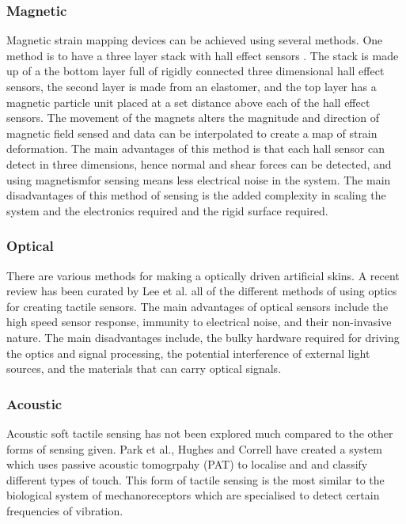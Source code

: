 \subsubsection{Magnetic}
Magnetic strain mapping devices can be achieved using several methods. One method is to have a three layer stack with hall effect sensors \cite{Yan2021}. The stack is made up of a the bottom layer full of rigidly connected three dimensional hall effect sensors, the second layer is made from an elastomer, and the top layer has a magnetic particle unit placed at a set distance above each of the hall effect sensors. The movement of the magnets alters the magnitude and direction of magnetic field sensed and data can be interpolated to create a map of strain deformation. The main advantages of this method is that each hall sensor can detect in three dimensions, hence normal and shear forces can be detected, and using magnetismfor sensing means less electrical noise in the system. The main disadvantages of this method of sensing is the added complexity in scaling the system and the electronics required and the rigid surface required.  

\subsubsection{Optical}
There are various methods for making a optically driven artificial skins. A recent review has been curated by Lee et al. \cite{Lee2023} all of the different methods of using optics for creating tactile sensors. The main advantages of optical sensors include the high speed sensor response, immunity to electrical noise, and their non-invasive nature. The main disadvantages include, the bulky hardware required for driving the optics and signal processing, the potential interference of external light sources, and the materials that can carry optical signals. 

\subsubsection{Acoustic}
Acoustic soft tactile sensing has not been explored much compared to the other forms of sensing given. Park et al., Hughes and Correll \cite{Park2022,Hughes2015} have created a system which uses passive acoustic tomogrpahy (PAT) to localise and and classify different types of touch. This form of tactile sensing is the most similar to the biological system of mechanoreceptors which are specialised to detect certain frequencies of vibration.

